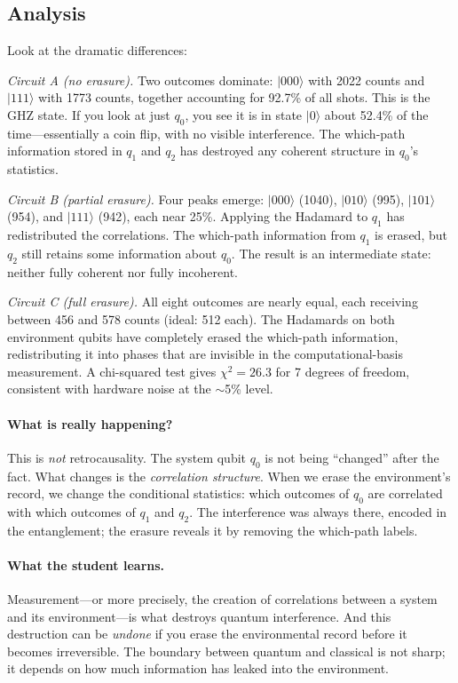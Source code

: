 \documentclass[amsmath,amssymb,reprint,aps,prb]{revtex4-2}
\newcommand{\ket}[1]{|#1\rangle}
\begin{document}
\subsection{Analysis}

Look at the dramatic differences:

\textit{Circuit A (no erasure).}  Two outcomes dominate:
$\ket{000}$ with 2022 counts and $\ket{111}$ with 1773 counts,
together accounting for 92.7\% of all shots.  This is the GHZ
state.  If you look at just $q_0$, you see it is in state
$\ket{0}$ about 52.4\% of the time---essentially a coin flip, with
no visible interference.  The which-path information stored in
$q_1$ and $q_2$ has destroyed any coherent structure in $q_0$'s
statistics.

\textit{Circuit B (partial erasure).}  Four peaks emerge:
$\ket{000}$ (1040), $\ket{010}$ (995), $\ket{101}$ (954), and
$\ket{111}$ (942), each near 25\%.  Applying the Hadamard to
$q_1$ has redistributed the correlations.  The which-path
information from $q_1$ is erased, but $q_2$ still retains some
information about $q_0$.  The result is an intermediate state:
neither fully coherent nor fully incoherent.

\textit{Circuit C (full erasure).}  All eight outcomes are nearly
equal, each receiving between 456 and 578 counts (ideal: 512 each).
The Hadamards on both environment qubits have completely erased
the which-path information, redistributing it into phases that are
invisible in the computational-basis measurement.  A chi-squared
test gives $\chi^2 = 26.3$ for 7 degrees of freedom, consistent
with hardware noise at the $\sim$5\% level.

\paragraph{What is really happening?}
This is \emph{not} retrocausality.  The system qubit $q_0$ is not
being ``changed'' after the fact.  What changes is the
\emph{correlation structure}.  When we erase the environment's
record, we change the conditional statistics: which outcomes of
$q_0$ are correlated with which outcomes of $q_1$ and $q_2$.
The interference was always there, encoded in the entanglement; the
erasure reveals it by removing the which-path labels.

\paragraph{What the student learns.}
Measurement---or more precisely, the creation of correlations
between a system and its environment---is what destroys quantum
interference.  And this destruction can be \emph{undone} if you
erase the environmental record before it becomes irreversible.
The boundary between quantum and classical is not sharp; it depends
on how much information has leaked into the environment.
\end{document}
